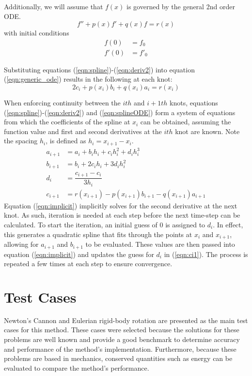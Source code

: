 \documentclass{article}
\begin{document}
Additionally, we will assume that $f(x)$ is governed by the general 2nd order ODE.
\begin{equation}
f'' + p(x)f' + q(x)f = r(x)\label{eqn:generic_ode}
\end{equation}
with initial conditions 
\begin{align*}
f(0) &= f_0\\
f'(0) &= f'_0
\end{align*}

Substituting equations (\ref{eqn:spline})-(\ref{eqn:deriv2}) into equation (\ref{eqn:generic_ode}) results in the following at each knot:
\begin{equation}
2c_i + p(x_i)b_i+q(x_i)a_i=r(x_i)\label{eqn:splineODE}
\end{equation}

When enforcing continuity between the $ith$ and $i+1th$ knots, equations (\ref{eqn:spline})-(\ref{eqn:deriv2}) and (\ref{eqn:splineODE}) form a system of equations from which the coefficients of the spline at $x_{i}$ can be obtained, assuming the function value and first and second derivatives at the $ith$ knot are known. Note the spacing $h_i$, is defined as $h_i = x_{i+1} - x_i$.
\begin{align}
a_{i+1} &= a_i + b_ih_i+c_ih_i^2 + d_ih_i^3\label{eqn:ai1}\\
b_{i+1} &= b_i+2c_ih_i + 3d_ih_i^2\label{eqn:bi1}\\
d_i &= \dfrac{c_{i+1} - c_i}{3h_i}\label{eqn:ci1}\\
c_{i+1} &= r(x_{i+1}) -  p(x_{i+1})b_{i+1} - q(x_{i+1})a_{i+1}\label{eqn:implicit}
\end{align}
Equation (\ref{eqn:implicit}) implicitly solves for the second derivative at the next knot. As such, iteration is needed at each step before the next time-step can be calculated. To start the iteration, an initial guess of 0 is assigned to $d_i$. In effect, this generates a quadratic spline that fits through the points at $x_i$ and $x_{i+1}$, allowing for $a_{i+1}$ and $b_{i+1}$ to be evaluated. These values are then passed into equation (\ref{eqn:implicit}) and updates the guess for $d_i$ in (\ref{eqn:ci1}). The process is repeated a few times at each step to ensure convergence.

\section{Test Cases}\label{sec:testCases}
Newton's Cannon and Eulerian rigid-body rotation are presented as the main test cases for this method. These cases were selected because the solutions for these problems are well known and provide a good benchmark to determine accuracy and performance of the method's implementation. Furthermore, because these problems are based in mechanics, conserved quantities such as energy can be evaluated to compare the method's performance.
\end{document}
